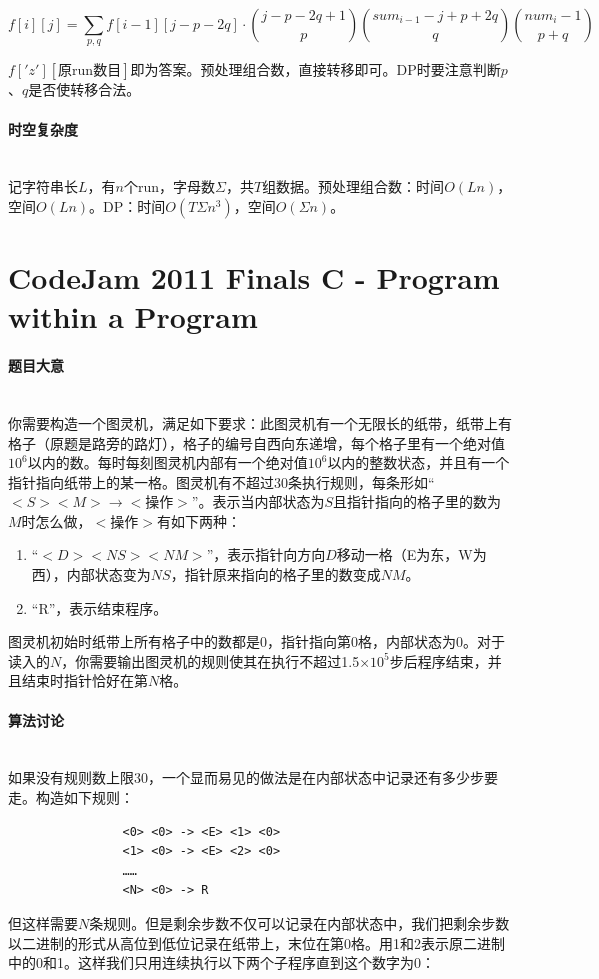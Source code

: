 \documentclass[UTF8]{ctexart}
\newcommand{\myparagraph}[1]{\paragraph{#1}\mbox{}\\}
\theoremstyle{nonumberplain}
\begin{document}
			$$ f[i][j]=\sum_{p,q} f[i-1][j-p-2q] \cdot \binom{j-p-2q+1}{p}\binom{sum_{i-1}-j+p+2q}{q}\binom{num_i-1}{p+q} $$
			
			$f['z'][\mbox{原run数目}]$即为答案。预处理组合数，直接转移即可。DP时要注意判断$p$、$q$是否使转移合法。
		
		\myparagraph{时空复杂度}
		
			记字符串长$L$，有$n$个run，字母数$\Sigma$，共$T$组数据。预处理组合数：时间$O(Ln)$，空间$O(Ln)$。DP：时间$O(T \Sigma n^3)$，空间$O(\Sigma n)$。
	
	\section{CodeJam 2011 Finals C - Program within a Program}
	
		\myparagraph{题目大意}
		
			你需要构造一个图灵机，满足如下要求：此图灵机有一个无限长的纸带，纸带上有格子（原题是路旁的路灯），格子的编号自西向东递增，每个格子里有一个绝对值$10^6$以内的数。每时每刻图灵机内部有一个绝对值$10^6$以内的整数状态，并且有一个指针指向纸带上的某一格。图灵机有不超过$30$条执行规则，每条形如“$<S> <M> \to <\mbox{操作}>$”。表示当内部状态为$S$且指针指向的格子里的数为$M$时怎么做，$<$操作$>$有如下两种：
			
			\begin{enumerate}
				\item “$<D> <NS> <NM>$”，表示指针向方向$D$移动一格（E为东，W为西），内部状态变为$NS$，指针原来指向的格子里的数变成$NM$。
				\item “R”，表示结束程序。
			\end{enumerate}
			
			图灵机初始时纸带上所有格子中的数都是0，指针指向第0格，内部状态为0。对于读入的$N$，你需要输出图灵机的规则使其在执行不超过1.5×$10^5$步后程序结束，并且结束时指针恰好在第$N$格。
		
		\myparagraph{算法讨论}
		
			如果没有规则数上限$30$，一个显而易见的做法是在内部状态中记录还有多少步要走。构造如下规则：
			
			\begin{verbatim}
				<0> <0> -> <E> <1> <0>
				<1> <0> -> <E> <2> <0>
				……
				<N> <0> -> R
			\end{verbatim}
			
			但这样需要$N$条规则。但是剩余步数不仅可以记录在内部状态中，我们把剩余步数以二进制的形式从高位到低位记录在纸带上，末位在第0格。用1和2表示原二进制中的0和1。这样我们只用连续执行以下两个子程序直到这个数字为0：
			
\end{document}
